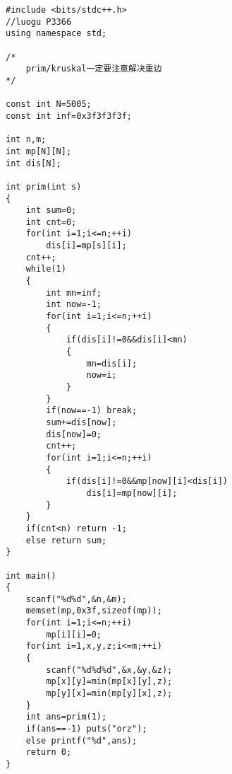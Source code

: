 \begin{lstlisting}
#include <bits/stdc++.h>
//luogu P3366
using namespace std;

/*
	prim/kruskal一定要注意解决重边
*/

const int N=5005;
const int inf=0x3f3f3f3f;

int n,m;
int mp[N][N];
int dis[N];

int prim(int s)
{
	int sum=0;
	int cnt=0;
	for(int i=1;i<=n;++i)
		dis[i]=mp[s][i];
	cnt++;
	while(1)
	{
		int mn=inf;
		int now=-1;
		for(int i=1;i<=n;++i)
		{
			if(dis[i]!=0&&dis[i]<mn)
			{
				mn=dis[i];
				now=i;
			}
		}
		if(now==-1) break;
		sum+=dis[now];
		dis[now]=0;
		cnt++;
		for(int i=1;i<=n;++i)
		{
			if(dis[i]!=0&&mp[now][i]<dis[i])
				dis[i]=mp[now][i];
		}
	}
	if(cnt<n) return -1;
	else return sum;
}

int main()
{
	scanf("%d%d",&n,&m);
	memset(mp,0x3f,sizeof(mp));
	for(int i=1;i<=n;++i)
		mp[i][i]=0;
	for(int i=1,x,y,z;i<=m;++i)
	{
		scanf("%d%d%d",&x,&y,&z);
		mp[x][y]=min(mp[x][y],z);
		mp[y][x]=min(mp[y][x],z);
	}
	int ans=prim(1);
	if(ans==-1) puts("orz");
	else printf("%d",ans);
	return 0;
}
\end{lstlisting}
